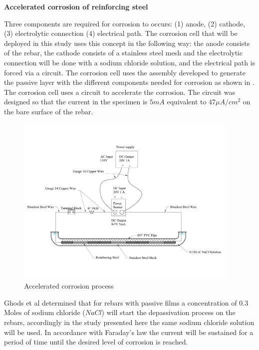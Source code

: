 \newpage
\textbf{Accelerated corrosion  of reinforcing steel}

Three components are required for corrosion to occurs: (1) anode, (2) cathode, (3) electrolytic connection (4) electrical path. The corrosion cell that will be deployed in this study uses this concept in the following way: the anode consists of the rebar, the cathode consists of a stainless steel mesh and the electrolytic connection will be done with a sodium chloride solution, and the electrical path is forced via a circuit. The corrosion cell uses the assembly developed to generate the passive layer with the different components needed for corrosion as shown in . The corrosion cell uses a circuit to accelerate the corrosion. The circuit was designed so that the current in the specimen is $5mA$ equivalent to $47\mu A/cm^2$ on the bare surface of the rebar.

\begin{figure}[htbp]
	\centering
	\includegraphics[width=0.95\textwidth]{Chapter-3/figs/AcceleratedCorrosionProcedure}
	\caption{Accelerated corrosion process}
	\label{fig:AcceleratedCorrosion}
\end{figure}

Ghods et al \cite{Ghods2010} determined that for rebars with passive films a concentration of 0.3 Moles of sodium chloride ($NaCl$) will start the depassivation process on the rebars, accordingly in the study presented here the same sodium chloride solution will be used. In accordance with Faraday's law the current will be sustained for a period of time until the desired level of corrosion is reached.


